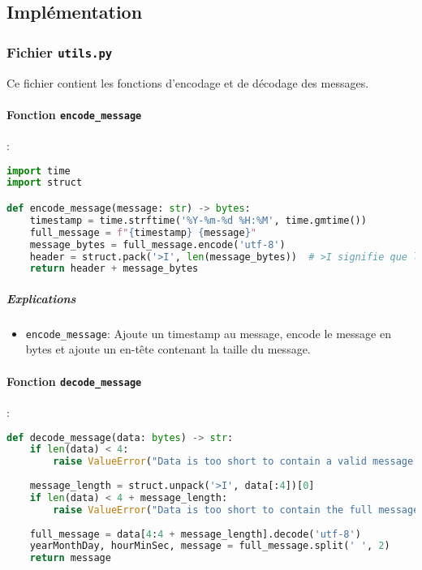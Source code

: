 \documentclass{article}
\begin{document}
\break\subsection{Implémentation}

\subsubsection{Fichier \texttt{utils.py}}

Ce fichier contient les fonctions d'encodage et de décodage des messages.

\paragraph{Fonction \texttt{encode\_message}}:

\begin{lstlisting}[language=Python, caption=encode\_message dans utils.py]
import time
import struct

def encode_message(message: str) -> bytes:
    timestamp = time.strftime('%Y-%m-%d %H:%M', time.gmtime())
    full_message = f"{timestamp} {message}"
    message_bytes = full_message.encode('utf-8')
    header = struct.pack('>I', len(message_bytes))  # >I signifie que le format est big-endian unsigned int
    return header + message_bytes
\end{lstlisting}

\subparagraph{Explications}

\begin{itemize}
    \item \texttt{encode\_message}: Ajoute un timestamp au message, encode le message en bytes et ajoute un en-tête contenant la taille du message.
\end{itemize}

\paragraph{Fonction \texttt{decode\_message}}:

\begin{lstlisting}[language=Python, caption=decode\_message dans utils.py]
def decode_message(data: bytes) -> str:
    if len(data) < 4:
        raise ValueError("Data is too short to contain a valid message header")
    
    message_length = struct.unpack('>I', data[:4])[0]
    if len(data) < 4 + message_length:
        raise ValueError("Data is too short to contain the full message")
    
    full_message = data[4:4 + message_length].decode('utf-8')
    yearMonthDay, hourMinSec, message = full_message.split(' ', 2)
    return message
\end{lstlisting}
\end{document}
